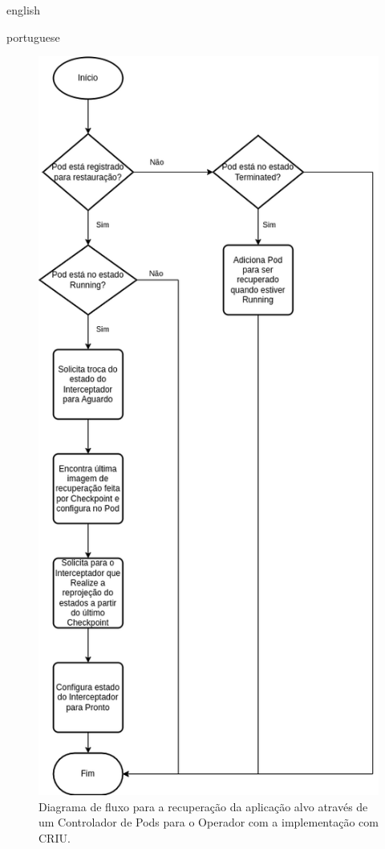 \begin{otherlanguage*}{english}
\begin{otherlanguage*}{portuguese}
\begin{figure}[h!]
\centering
\includegraphics[scale=0.46]{images/restore-pod-criu.png}
\caption{Diagrama de fluxo para a recuperação da aplicação alvo através de um Controlador de Pods para o Operador com a implementação com CRIU.}
\label{fig:restore-pod}
\end{figure}


\end{otherlanguage*}
\end{otherlanguage*}

